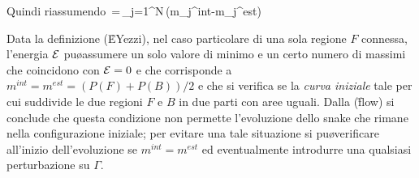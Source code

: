 Quindi riassumendo
\be
{}\,=\,\sum_{j=1}^{N}\,(m_j^{int}-m_j^{est})\,
\ee
\ealg
 
\boss
Data la definizione (\r{EYezzi}), nel caso particolare di una sola regione $F$ connessa, 
l'energia ${\cal E}$ pu\o assumere un solo valore di minimo e un certo numero di massimi
che coincidono con ${\cal E}=0$ e che corrisponde a $m^{int}=m^{est}=(P(F)+P(B))/2$ e che
si verifica se la {\it curva iniziale} \e tale per cui suddivide le due regioni $F$ e $B$
in due parti con aree uguali. 
Dalla (\r{flow}) si conclude che questa condizione non permette l'evoluzione dello snake che
rimane nella configurazione iniziale; per evitare una tale situazione si pu\o verificare 
all'inizio dell'evoluzione se $m^{int}=m^{est}$ ed eventualmente introdurre una qualsiasi 
perturbazione su $\Gamma$.
\eoss

\finepar



